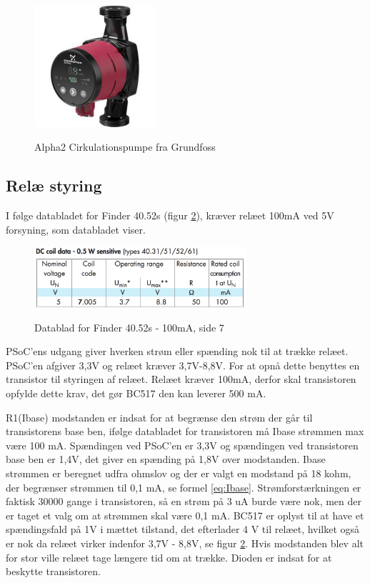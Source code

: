 \begin{figure}[H] \centering
{\includegraphics[width=0.4\textwidth]{filer/design/Billeder/Alpha2}}
\caption{Alpha2 Cirkulationspumpe fra Grundfoss}
\label{lab:Alpha2}
\raggedright
\end{figure} 

\subsection{Relæ styring}

I følge databladet for Finder 40.52s (figur \ref{lab:finder4052s}), kræver relæet 100mA ved 5V forsyning, som databladet viser.

\begin{figure}[H] \centering
{\includegraphics[width=0.7\textwidth]{filer/design/Billeder/finder4052s}}
\caption{Datablad for Finder 40.52s - 100mA, side 7}
\label{lab:finder4052s}
\raggedright
\end{figure} 

PSoC'ens udgang giver hverken strøm eller spænding nok til at trække relæet. PSoC'en afgiver 3,3V og relæet kræver 3,7V-8,8V. For at opnå dette benyttes en transistor til styringen af relæet. Relæet kræver 100mA, derfor skal transistoren opfylde dette krav, det gør BC517 den kan leverer 500 mA. \newline

R1(Ibase) modstanden er indsat for at begrænse den strøm der går til transistorens base ben, ifølge databladet for transistoren må Ibase strømmen max være 100 mA. Spændingen ved PSoC'en er 3,3V og spændingen ved transistoren base ben er 1,4V, det giver en spænding på 1,8V over modstanden. Ibase strømmen er beregnet udfra ohmslov og der er valgt en modstand på 18 kohm, der begrænser strømmen til 0,1 mA, se formel \ref{eq:Ibase}.
\newline
Strømforstærkningen er faktisk 30000 gange i transistoren, så en strøm på 3 uA burde være nok, men der er taget et valg om at strømmen skal være 0,1 mA. BC517 er oplyst til at have et spændingsfald på 1V i mættet tilstand, det efterlader 4 V til relæet, hvilket også er nok da relæet virker indenfor 3,7V - 8,8V, se figur \ref{lab:finder4052s}. Hvis modstanden blev alt for stor ville relæet tage længere tid om at trække. Dioden er indsat for at beskytte transistoren.

